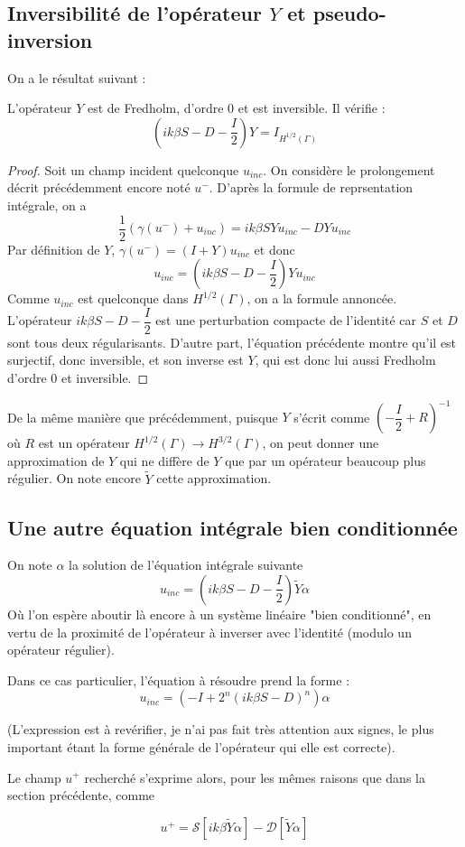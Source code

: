 \documentclass[11pt,a4paper]{article}
\begin{document}
\subsection{Inversibilité de l'opérateur $Y$ et pseudo-inversion}

On a le résultat suivant : 
\begin{Prop} L'opérateur $Y$ est de Fredholm, d'ordre $0$ et est inversible. Il vérifie : 
\[\left(ik\beta S - D - \dfrac{I}{2}\right)Y = I_{H^{1/2}(\Gamma)}\]
\begin{proof}
Soit un champ incident quelconque $u_{inc}$. On considère le prolongement décrit précédemment encore noté $u^-$. D'après la formule de reprsentation intégrale, on a 
\[\dfrac{1}{2}\left(\gamma(u^-)+u_{inc}\right) = ik\beta SY u_{inc} -  DY u_{inc}\]
Par définition de $Y$, $\gamma(u^-) = (I + Y)u_{inc}$ et donc 
\[u_{inc} = \left(ik\beta S  - D - \dfrac{I}{2}\right)Y u_{inc}\]
Comme $u_{inc}$ est quelconque dans $H^{1/2}(\Gamma)$, on a la formule annoncée. L'opérateur $ik\beta S  - D - \dfrac{I}{2}$ est une perturbation compacte de l'identité car $S$ et $D$ sont tous deux régularisants. D'autre part, l'équation précédente montre qu'il est surjectif, donc inversible, et son inverse est $Y$, qui est donc lui aussi Fredholm d'ordre $0$ et inversible. 
\end{proof}
\end{Prop}

De la même manière que précédemment, puisque $Y$ s'écrit comme $\left(-\dfrac{I}{2}+R\right)^{-1}$ où $R$ est un opérateur $H^{1/2}(\Gamma) \to H^{3/2}(\Gamma)$, on peut donner une approximation de $Y$ qui ne diffère de $Y$ que par un opérateur beaucoup plus régulier. On note encore $\tilde{Y}$ cette approximation. 

\subsection{Une autre équation intégrale bien conditionnée}

On note $\alpha$ la solution de l'équation intégrale suivante
\[u_{inc}=\left(ik\beta S  - D - \dfrac{I}{2}\right)\tilde{Y}\alpha\]
Où l'on espère aboutir là encore à un système linéaire "bien conditionné", en vertu de la proximité de l'opérateur à inverser avec l'identité (modulo un opérateur régulier). 

\begin{Rem}
Dans ce cas particulier, l'équation à résoudre prend la forme : 
\[ u_{inc} = \left(-I + 2^n \left(ik\beta S  - D\right)^n\right) \alpha\]
\end{Rem} 
(L'expression est à revérifier, je n'ai pas fait très attention aux signes, le plus important étant la forme générale de l'opérateur qui elle est correcte). 

Le champ $u^+$ recherché s'exprime alors, pour les mêmes raisons que dans la section précédente, comme 

\[ u^+ = \mathcal{S}\left[ik\beta \tilde{Y} \alpha\right] - \mathcal{D} \left[\tilde{Y} \alpha\right]\]


\nocite{aboudTerrasse}

 
\end{document}
